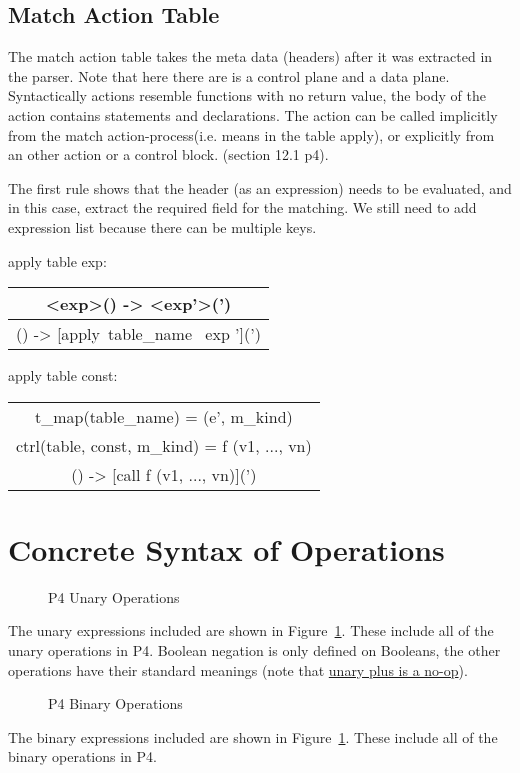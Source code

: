 \documentclass[UTF8]{article}
\makeatletter
\newcommand*{\inference}[3][t]{%
   \begingroup
   \def\and{\\}%
   \begin{tabular}[#1]{@{\enspace}c@{\enspace}}
   #2 \\
   \hline
   #3
   \end{tabular}%
   \endgroup
}
\makeatother
\begin{document}
\subsection{Match Action Table}
 The match action table takes the meta data (headers) after it was extracted in the parser. Note that here there are is a control plane and a data plane. 
Syntactically actions resemble functions with no return value, the body of the action contains statements and declarations. The action can be called implicitly from the match action-process(i.e. means in the table apply), or explicitly from an other action or a control block. (section 12.1 p4).

The first rule shows that the header (as an expression) needs to be evaluated, and in this case, extract the required field for the matching. 
We still need to add expression list because there can be multiple keys.

\bigskip
\bigskip
apply table exp:

\inference[c]{<exp>(\sigma) -> <exp'>(\sigma ') }
            {[apply table\_name exp](\sigma) -> [apply\ table\_name \ exp '](\sigma ')}
\bigskip
\bigskip
\bigskip

apply table const:

\inference[c]{t\_map(table\_name) = (e', m\_kind)
            \and ctrl(table\name, const, m\_kind) = f (v1, ..., vn)
             }
              {[apply table\_name const](\sigma) -> [call f (v1, ..., vn)](\sigma ')}

              

\printbibliography

\clearpage
\appendix
\section{Concrete Syntax of Operations}
\label{app:op}
\begin{figure}[ht!]
\centering\ottgrammartabular{
\ottunop\ottafterlastrule
}
\caption{P4 Unary Operations}
\label{fig:unop}
\end{figure}

The unary expressions included are shown in Figure~\ref{fig:unop}. These include all of the unary operations in P4. Boolean negation is only defined on Booleans, the other operations have their standard meanings (note that \href{https://p4.org/p4-spec/docs/P4-16-v1.2.1.html#sec-bit-ops}{unary plus is a no-op}).

\newpage
\begin{figure}[ht!]
\centering\ottgrammartabular{
\ottbinop\ottafterlastrule
}
\caption{P4 Binary Operations}
\label{fig:binop}
\end{figure}

The binary expressions included are shown in Figure~\ref{fig:unop}. These include all of the binary operations in P4.
\end{document}
